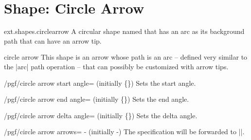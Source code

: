 %
%
%
\section{Shape: Circle Arrow}
\begin{pgflibrary}{ext.shapes.circlearrow}
  A circular shape named that has an arc as its background path that can have an arrow tip.
\end{pgflibrary}
\begin{shape}{circle arrow}
  This shape is an arrow whose path is an arc -- defined very similar to the |arc|%
   path operation -- that can possibly be customized with
  arrow tips.
  
  \begin{key}{/pgf/circle arrow start angle= (initially \{\})}
  Sets the start angle.
  \end{key}
  \begin{key}{/pgf/circle arrow end angle= (initially \{\})}
  Sets the end angle.
  \end{key}
  \begin{key}{/pgf/circle arrow delta angle= (initially \{\})}
  Sets the delta angle.
  \end{key}
  \begin{key}{/pgf/circle arrow arrows=%
    - (initially -)}
  The specification will be forwarded to |\pgfsetarrows|\indexCommandO{\pgfsetarrows}.
  \end{key}
  

\end{shape}
